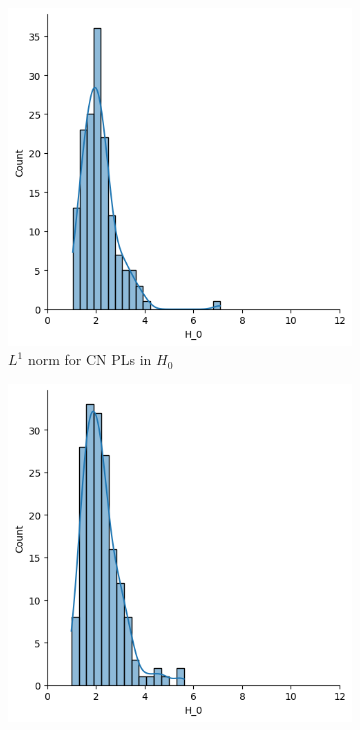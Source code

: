 \documentclass{article}
\begin{document}
\begin{figure}[htb]
  \centering
  \begin{subfigure}{0.32\textwidth}
    \includegraphics[width=\textwidth]{figures/median_pls/median_pl_CN_H_0_displot.png}
    \caption{$L^1$ norm for CN PLs in $H_0$}
  \end{subfigure}
  \begin{subfigure}{0.32\textwidth}
    \includegraphics[width=\textwidth]{figures/median_pls/median_pl_MCI_H_0_displot.png}

\end{subfigure}
\end{figure}
\end{document}
